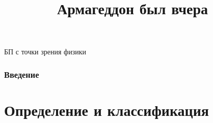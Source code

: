 \documentclass[aspectratio=169]{beamer}
\title[Армагеддон был вчера]{Армагеддон был вчера}
\author{}
\date{}
\begin{document}
{
\begin{frame}[plain]
\vspace{-5.4cm}
\centerline{БП с точки зрения физики}
\end{frame}
}

\begin{frame}
\frametitle{Введение}
\tableofcontents
\end{frame}

\section{Определение и классификация}
\end{document}
